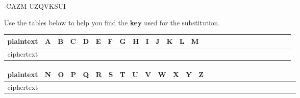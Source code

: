 \documentclass[12pt]{amsart}
\theoremstyle{definition}
\theoremstyle{remark}
\numberwithin{equation}{section}
\begin{document}
\noindent
\vspace{15pt}
-CAZM UZQVKSUI

\vspace{10pt}

Use the tables below to help you find the {\bf key} used for the substitution.

{\Large
\begin{center}
  \begin{tabular}{ | c | c | c | c |c |c |c |c |c |c |c |c |c |c |c |c |c |c |c |c |c |c |c |c |c |c |c |}
    \hline
    plaintext & A & B & C & D & E & F & G & H & I & J & K & L & M \\ \hline
    ciphertext &  &&&&&&&&&&&& \\ \hline
  \end{tabular}
\end{center}

\vspace{10pt}

\begin{center}
  \begin{tabular}{ | c | c | c | c |c |c |c |c |c |c |c |c |c |c |c |c |c |c |c |c |c |c |c |c |c |c |c |}
    \hline
    plaintext & N & O & P & Q & R & S & T & U & V & W & X & Y & Z \\ \hline
    ciphertext &  &&&&&&&&&&&& \\ \hline
  \end{tabular}
\end{center}
}
\end{document}
